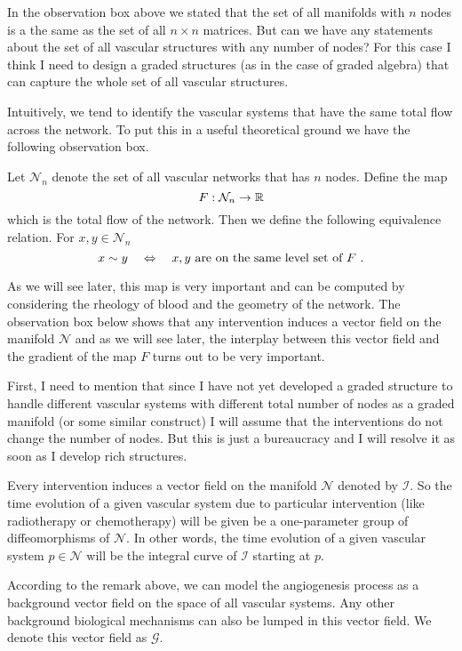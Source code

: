 \begin{remark}
	In the observation box above we stated that the set of all manifolds with $ n $ nodes is a the same as the set of all $ n\times n $ matrices. But can we have any statements about the set of all vascular structures with any number of nodes? For this case I think I need to design a graded structures (as in the case of graded algebra) that can capture the whole set of all vascular structures.
\end{remark}

Intuitively, we tend to identify the vascular systems that have the same total flow across the network. To put this in a useful theoretical ground we have the following observation box.

\begin{observation}
	Let $ \mathcal{N}_n $ denote the set of all vascular networks that has $ n $ nodes. Define the map
	\[ F: \mathcal{N}_n \to \mathbb{R} \]
	which is the total flow of the network. Then we define the following equivalence relation. For $ x,y \in \mathcal{N}_n $
	\[ x \sim y \quad \Leftrightarrow \quad x,y \text{ are on the same level set of $ F $ }. \]
\end{observation}
As we will see later, this map is very important and can be computed by considering the rheology of blood and the geometry of the network. The observation box below shows that any intervention induces a vector field on the manifold $ \mathcal{N} $ and as we will see later, the interplay between this vector field and the gradient of the map $ F $ turns out to be very important. 

\begin{observation}
	First, I need to mention that since I have not yet developed a graded structure to handle different vascular systems with different total number of nodes as a graded manifold (or some similar construct) I will assume that the interventions do not change the number of nodes. But this is just a bureaucracy and I will resolve it as soon as I develop rich structures. 
	
	Every intervention induces a vector field on the manifold $ \mathcal{N} $ denoted by $ \mathcal{I} $. So the time evolution of a given vascular system due to particular intervention (like radiotherapy or chemotherapy) will be given be a one-parameter group of diffeomorphisms of $ \mathcal{N} $. In other words, the time evolution of a given vascular system $ p \in \mathcal{N} $ will be the integral curve of $ \mathcal{I} $ starting at $ p $.
\end{observation}
\begin{remark}
	According to the remark above, we can model the angiogenesis process as a background vector field on the space of all vascular systems. Any other background biological mechanisms can also be lumped in this vector field. We denote this vector field as $ \mathcal{G} $.
\end{remark}


